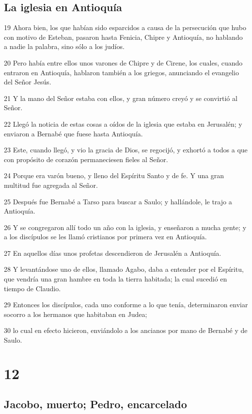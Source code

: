\section*{La iglesia en Antioquía}

\par 19 Ahora bien, los que habían sido esparcidos a causa de la persecución que hubo con motivo de Esteban, pasaron hasta Fenicia, Chipre y Antioquía, no hablando a nadie la palabra, sino sólo a los judíos.
\par 20 Pero había entre ellos unos varones de Chipre y de Cirene, los cuales, cuando entraron en Antioquía, hablaron también a los griegos, anunciando el evangelio del Señor Jesús.
\par 21 Y la mano del Señor estaba con ellos, y gran número creyó y se convirtió al Señor.
\par 22 Llegó la noticia de estas cosas a oídos de la iglesia que estaba en Jerusalén; y enviaron a Bernabé que fuese hasta Antioquía.
\par 23 Este, cuando llegó, y vio la gracia de Dios, se regocijó, y exhortó a todos a que con propósito de corazón permaneciesen fieles al Señor.
\par 24 Porque era varón bueno, y lleno del Espíritu Santo y de fe. Y una gran multitud fue agregada al Señor.
\par 25 Después fue Bernabé a Tarso para buscar a Saulo; y hallándole, le trajo a Antioquía.
\par 26 Y se congregaron allí todo un año con la iglesia, y enseñaron a mucha gente; y a los discípulos se les llamó cristianos por primera vez en Antioquía.
\par 27 En aquellos días unos profetas descendieron de Jerusalén a Antioquía.
\par 28 Y levantándose uno de ellos, llamado Agabo, daba a entender por el Espíritu, que vendría una gran hambre en toda la tierra habitada; la cual sucedió en tiempo de Claudio.
\par 29 Entonces los discípulos, cada uno conforme a lo que tenía, determinaron enviar socorro a los hermanos que habitaban en Judea;
\par 30 lo cual en efecto hicieron, enviándolo a los ancianos por mano de Bernabé y de Saulo.

\chapter{12}

\section*{Jacobo, muerto; Pedro, encarcelado}

